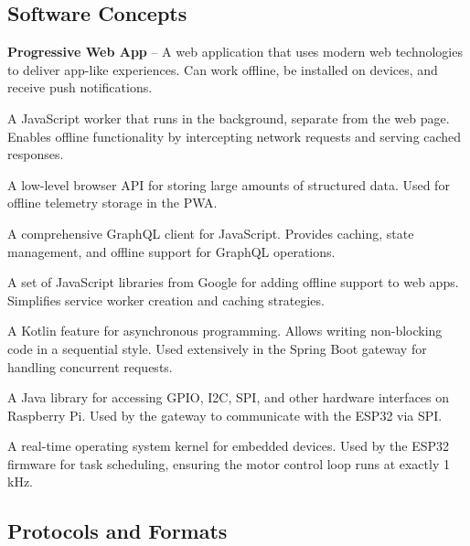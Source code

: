 \subsection{Software Concepts}

\begin{description}[style=nextline, leftmargin=2cm]
    \item[PWA] \textbf{Progressive Web App} -- A web application that uses modern web technologies to deliver app-like experiences. Can work offline, be installed on devices, and receive push notifications.

    \item[Service Worker] A JavaScript worker that runs in the background, separate from the web page. Enables offline functionality by intercepting network requests and serving cached responses.

    \item[IndexedDB] A low-level browser API for storing large amounts of structured data. Used for offline telemetry storage in the PWA.

    \item[Apollo Client] A comprehensive GraphQL client for JavaScript. Provides caching, state management, and offline support for GraphQL operations.

    \item[Workbox] A set of JavaScript libraries from Google for adding offline support to web apps. Simplifies service worker creation and caching strategies.

    \item[Coroutines] A Kotlin feature for asynchronous programming. Allows writing non-blocking code in a sequential style. Used extensively in the Spring Boot gateway for handling concurrent requests.

    \item[Pi4J] A Java library for accessing GPIO, I2C, SPI, and other hardware interfaces on Raspberry Pi. Used by the gateway to communicate with the ESP32 via SPI.

    \item[FreeRTOS] A real-time operating system kernel for embedded devices. Used by the ESP32 firmware for task scheduling, ensuring the motor control loop runs at exactly 1 kHz.
\end{description}

\subsection{Protocols and Formats}


